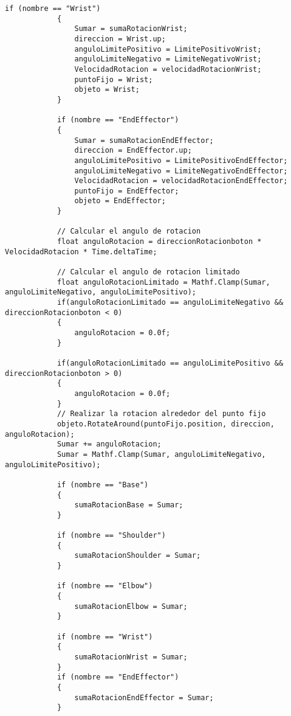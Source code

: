 \begin{lstlisting}[frame=single]
            if (nombre == "Wrist")
            {
                Sumar = sumaRotacionWrist;
                direccion = Wrist.up;
                anguloLimitePositivo = LimitePositivoWrist;
                anguloLimiteNegativo = LimiteNegativoWrist;
                VelocidadRotacion = velocidadRotacionWrist;
                puntoFijo = Wrist;
                objeto = Wrist;
            }

            if (nombre == "EndEffector")
            {
                Sumar = sumaRotacionEndEffector;
                direccion = EndEffector.up;
                anguloLimitePositivo = LimitePositivoEndEffector;
                anguloLimiteNegativo = LimiteNegativoEndEffector;
                VelocidadRotacion = velocidadRotacionEndEffector;
                puntoFijo = EndEffector;
                objeto = EndEffector;
            }
            
            // Calcular el angulo de rotacion
            float anguloRotacion = direccionRotacionboton * VelocidadRotacion * Time.deltaTime;
            
            // Calcular el angulo de rotacion limitado
            float anguloRotacionLimitado = Mathf.Clamp(Sumar, anguloLimiteNegativo, anguloLimitePositivo);
            if(anguloRotacionLimitado == anguloLimiteNegativo && direccionRotacionboton < 0)
            {
                anguloRotacion = 0.0f;
            }

            if(anguloRotacionLimitado == anguloLimitePositivo && direccionRotacionboton > 0)
            {
                anguloRotacion = 0.0f;
            }
            // Realizar la rotacion alrededor del punto fijo
            objeto.RotateAround(puntoFijo.position, direccion, anguloRotacion);
            Sumar += anguloRotacion;
            Sumar = Mathf.Clamp(Sumar, anguloLimiteNegativo, anguloLimitePositivo);

            if (nombre == "Base")
            {
                sumaRotacionBase = Sumar;
            }

            if (nombre == "Shoulder")
            {
                sumaRotacionShoulder = Sumar;
            }

            if (nombre == "Elbow")
            {
                sumaRotacionElbow = Sumar;
            }

            if (nombre == "Wrist")
            {
                sumaRotacionWrist = Sumar;
            }
            if (nombre == "EndEffector")
            {
                sumaRotacionEndEffector = Sumar;
            }
            

\end{lstlisting}
